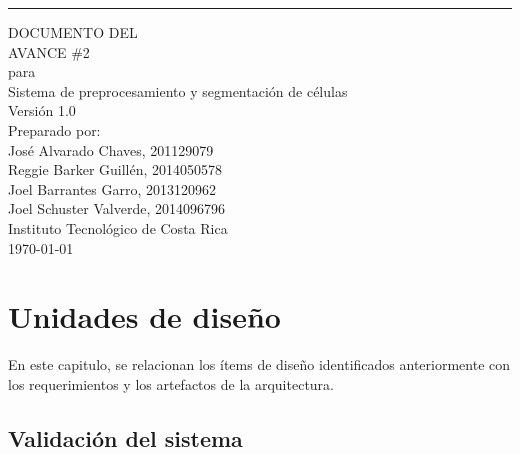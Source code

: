 \documentclass{scrreprt}
\date{}
\def\myversion{1.0}
\begin{document}
\begin{flushright}
	\rule{16cm}{0.2cm}\vskip1cm
    \begin{bfseries}
        \Huge{DOCUMENTO DEL \\ AVANCE \#2}\\
        \vspace{0.5cm}
        para\\
        \vspace{0.5cm}
        Sistema de preprocesamiento y segmentación de células\\
        \vspace{1.0cm}
        \LARGE{Versión \myversion}\\
        \vspace{1.0cm}
        Preparado por:\\ \vspace{0.5cm}
        	José Alvarado Chaves, 201129079\\
            Reggie Barker Guillén, 2014050578\\
            Joel Barrantes Garro, 2013120962\\
            Joel Schuster Valverde, 2014096796\\                        
        \vspace{1.5cm}
        Instituto Tecnológico de Costa Rica\\
        \vspace{1.5cm}
        \today\\
    \end{bfseries}
\end{flushright}


\tableofcontents




\chapter{Unidades de diseño}

En este capitulo, se relacionan los ítems de diseño identificados anteriormente con los requerimientos y los artefactos de la arquitectura.

\section{Validación del sistema}
\end{document}
